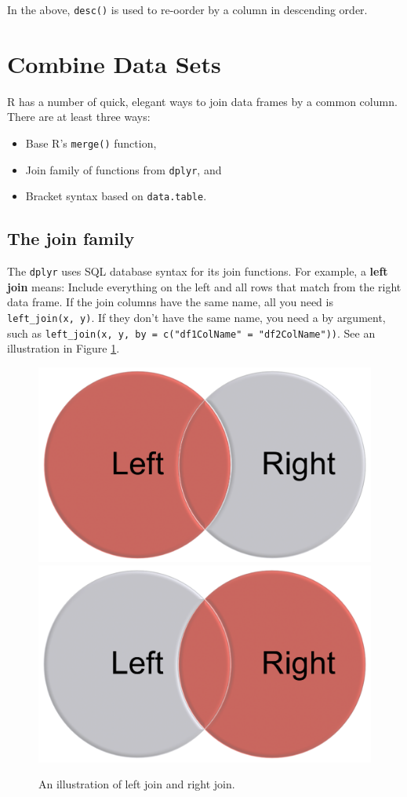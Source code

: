 \documentclass[]{book}
\providecommand{\tightlist}{%
  \setlength{\itemsep}{0pt}\setlength{\parskip}{0pt}}
\begin{document}
In the above, \texttt{desc()} is used to re-oorder by a column in
descending order.

\section{Combine Data Sets}\label{combine-data-sets}

R has a number of quick, elegant ways to join data frames by a common
column. There are at least three ways:

\begin{itemize}
\tightlist
\item
  Base R's \texttt{merge()} function,
\item
  Join family of functions from \texttt{dplyr}, and
\item
  Bracket syntax based on \texttt{data.table}.
\end{itemize}

\subsection{The join family}\label{the-join-family}

The \texttt{dplyr} uses SQL database syntax for its join functions. For
example, a \textbf{left join} means: Include everything on the left and
all rows that match from the right data frame. If the join columns have
the same name, all you need is \texttt{left\_join(x,\ y)}. If they don't
have the same name, you need a by argument, such as
\texttt{left\_join(x,\ y,\ by\ =\ c("df1ColName"\ =\ "df2ColName"))}.
See an illustration in Figure \ref{fig:lrjoin}.

\begin{figure}

{\centering \includegraphics[width=0.3\linewidth]{figures/Left} \includegraphics[width=0.3\linewidth]{figures/Right} 

}

\caption{An illustration of left join and right join.}\label{fig:lrjoin}
\end{figure}
\end{document}
